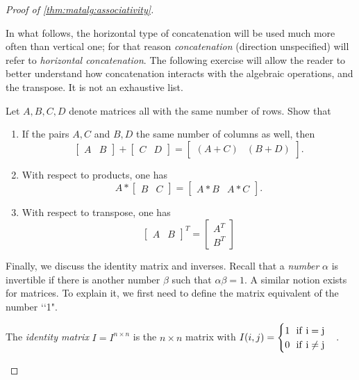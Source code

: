 \documentclass{ximera}
\begin{document}
\begin{proof}[Proof of \ref{thm:matalg:associativity}]
\begin{exercise}
In what follows, the horizontal type of concatenation will be used much more often than vertical one; for that reason {\it concatenation} (direction unspecified) will refer to {\it horizontal concatenation}. The following exercise will allow the reader to better understand how concatenation interacts with the algebraic operations, and the transpose. It is not an exhaustive list.

\begin{exercise} Let $A, B, C, D$ denote matrices all with the same number of rows. Show that
\begin{enumerate}
\item If the pairs $A,C$ and $B,D$ the same number of columns as well, then
\[
\begin{bmatrix} A & B\end{bmatrix} + \begin{bmatrix} C & D\end{bmatrix} = \begin{bmatrix} (A+C) & (B+D)\end{bmatrix}.
\]
\item With respect to products, one has
\[
A*\begin{bmatrix} B & C\end{bmatrix} = \begin{bmatrix} A*B & A*C\end{bmatrix}.
\]
\item With respect to transpose, one has
\[
\begin{bmatrix} A & B\end{bmatrix}^T = \begin{bmatrix} A^T \\ B^T\end{bmatrix}
\]
\end{enumerate}
\end{exercise}

Finally, we discuss the identity matrix and inverses. Recall that a {\it number} $\alpha$ is invertible if there is another number $\beta$ such that $\alpha\beta = 1$. A similar notion exists for matrices. To explain it, we first need to define the matrix equivalent of the number \lq\lq 1".

\begin{definition} The {\it identity matrix} $I = I^{n\times n}$ is the $n\times n$ matrix with $I(i,j) = \begin{cases}1\ \ \rm{if}\ i=j\\0\ \ \rm{if}\ i\ne j\end{cases}$.
\end{definition}


\end{exercise}
\end{proof}
\end{document}
